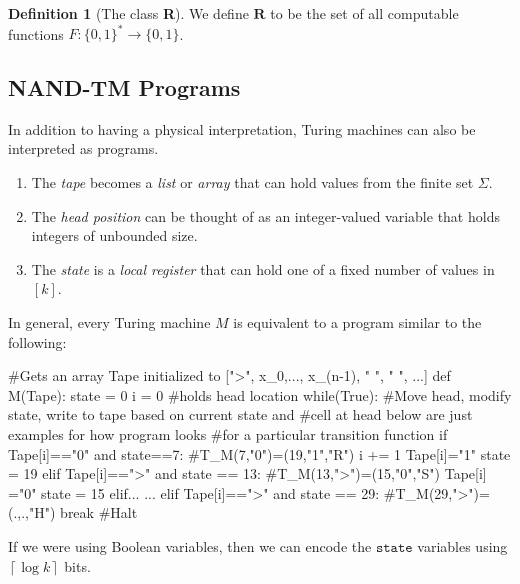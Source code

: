 \documentclass[a4paper, 12pt]{report}
\theoremstyle{remark}
\theoremstyle{definition}
\newtheorem{definition}{Definition}[section]
\begin{document}
\begin{definition}[The class \textbf{R}]
We define $\textbf{R}$ to be the set of all computable functions $F: \{0,1\}^* \longrightarrow \{0,1\}$. 
\end{definition}

\subsection{NAND-TM Programs}
In addition to having a physical interpretation, Turing machines can also be interpreted as programs. 
\begin{enumerate}
    \item The \textit{tape} becomes a \textit{list} or \textit{array} that can hold values from the finite set $\Sigma$. 
    \item The \textit{head position} can be thought of as an integer-valued variable that holds integers of unbounded size. 
    \item The \textit{state} is a \textit{local register} that can hold one of a fixed number of values in $[k]$. 
\end{enumerate}
In general, every Turing machine $M$ is equivalent to a program similar to the following: 
\begin{python}
#Gets an array Tape initialized to [">", x_0,..., x_(n-1), " ", " ", ...]
def M(Tape): 
    state = 0
    i     = 0  #holds head location
    while(True): 
        #Move head, modify state, write to tape based on current state and 
        #cell at head below are just examples for how program looks 
        #for a particular transition function
        if Tape[i]=="0" and state==7: #T_M(7,"0")=(19,"1","R") 
            i += 1
            Tape[i]="1"
            state = 19
        elif Tape[i]==">" and state == 13: #T_M(13,">")=(15,"0","S")
            Tape[i] ="0"
            state = 15
        elif... 
            ...
        elif Tape[i]==">" and state == 29: #T_M(29,">")=(.,.,"H")
            break  #Halt
\end{python}
If we were using Boolean variables, then we can encode the $\texttt{state}$ variables using $\left\lceil{\log k}\right\rceil$ bits. 
\end{document}
